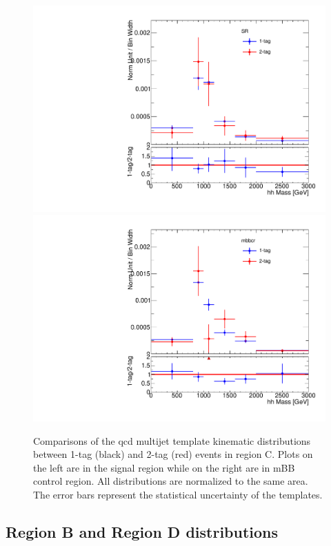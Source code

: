 \begin{figure}[!htbp]
\begin{center}
\includegraphics[scale=0.33]{./figures/boosted/ABCD/ABCD_2TagVs1Tag_SR_lepton_hhMass}    
\includegraphics[scale=0.33]{./figures/boosted/ABCD/ABCD_2TagVs1Tag_mbbcr_lepton_hhMass} 
\caption{Comparisons of the qcd multijet template kinematic distributions between 1-tag (black) and 2-tag (red) events 
in region C. Plots on the left are in the signal region while on the right are in mBB control region. All distributions
are normalized to the same area. The error bars represent the statistical uncertainty of the templates.}
\label{fig:boosted_abcd_2tag1tag}
\end{center}
\end{figure}

\FloatBarrier
%
%
\subsection{Region B and Region D distributions}
\label{app:boosted_qcd_region_bd}


